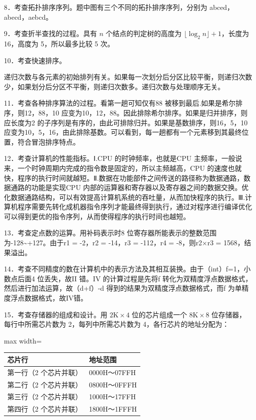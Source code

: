 \documentclass[UTF8,11pt]{ctexart}
\begin{document}
8．考查拓扑排序序列。题中图有三个不同的拓扑排序序列，分别为 abced，abecd，aebcd。


9．考查折半查找的过程。具有 \(\displaystyle n\) 个结点的判定树的高度为 \(\displaystyle \lfloor\log_2n\rfloor+1\)，长度为 16，高度为 5，所以最多比较 5 次。


10．考查快速排序。


递归次数与各元素的初始排列有关。如果每一次划分后分区比较平衡，则递归次数少，如果划分后分区不平衡，则递归次数多。递归次数与处理顺序无关。


11．考查各种排序算法的过程。看第一趟可知仅有88 被移到最后.如果是希尔排序，则12，88，10 应变为10，12，88。因此排除希尔排序。如果是归并排序，则应长度为2 的子序列是有序的，由此可排除归并。如果是基数排序，则16，5，10 应变为10，5，16，由此排除基数。可以看到，每一趟都有一个元素移到其最终位置，符合冒泡排序特点。


12．考查计算机的性能指标。Ⅰ.CPU 的时钟频率，也就是CPU 主频率，一般说来，一个时钟周期内完成的指令数是固定的，所以主频越高，CPU 的速度也就快，程序的执行时间就越短。Ⅱ.数据在功能部件之间传送的路径称为数据通路，数据通路的功能是实现CPU 内部的运算器和寄存器以及寄存器之间的数据交换。优化数据通路结构，可以有效提高计算机系统的吞吐量，从而加快程序的执行。Ⅲ.计算机程序需要先转化成机器指令序列才能最终得到执行，通过对程序进行编译优化可以得到更优的指令序列，从而使得程序的执行时间也越短。


13．考查定点数的运算。用补码表示时8 位寄存器所能表示的整数范围为-128\textasciitilde{}+127。由于r1 = -2，r2 = -14，r3 = -112，r4 = -8，则r2×r3 = 1568，结果溢出。


14．考查不同精度的数在计算机中的表示方法及其相互装换。由于（int）f=1，小数点后面4 位丢失，故II 错。IV 的计算过程是先将f 转化为双精度浮点数据格式，然后进行加法运算，故（d+f）-d 得到的结果为双精度浮点数据格式，而f 为单精度浮点数据格式，故IV错。


15．考查存储器的组成和设计。用 \(\displaystyle 2\mathrm{K}\times4\) 位的芯片组成一个 \(\displaystyle 8\mathrm{K}\times8\) 位存储器，每行中所需芯片数为 2，每列中所需芯片数为 4，各行芯片的地址分配为：


\begin{center}\begin{adjustbox}{max width=\linewidth}\begin{tabular}{|>{\raggedright\arraybackslash}p{\dimexpr(\linewidth-4\tabcolsep-3\arrayrulewidth)/2\relax}|>{\raggedright\arraybackslash}p{\dimexpr(\linewidth-4\tabcolsep-3\arrayrulewidth)/2\relax}|}\hline
芯片行 & 地址范围\\\hline
第一行（2 个芯片并联） & 0000H～07FFH\\\hline
第二行（2 个芯片并联） & 0800H～0FFFH\\\hline
第三行（2 个芯片并联） & 1000H～17FFH\\\hline
第四行（2 个芯片并联） & 1800H～1FFFH\\\hline\end{tabular}\end{adjustbox}\end{center}
\end{document}
